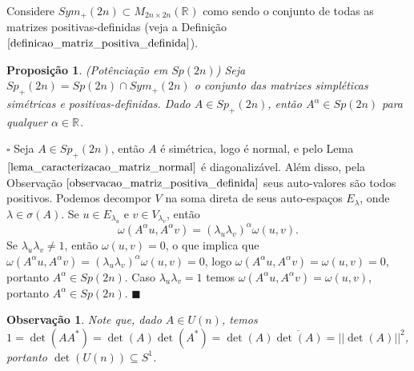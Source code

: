 \documentclass[12pt]{book}
\newtheorem{observacao}[teorema]{Observação}
\newtheorem{proposicao}[teorema]{Proposição}
\newenvironment{prova}[1]{$\square$ #1}{\hfill$\blacksquare$}
\newcommand{\espectrooperador}[1]{\sigma(#1)}
\newcommand{\gruposimpletico}[1]{Sp(#1)}
\newcommand{\gruposimpleticopositivo}[1]{Sp_{+}(#1)}
\newcommand{\matrizquadreal}[1]{M_{#1 \times #1}(\real{})}
\newcommand{\matrizsimetricapositiva}[1]{Sym_{+}(#1)}
\newcommand{\matrizunitaria}[1]{U(#1)}
\newcommand{\real}[1]{\mathbb{R}^{#1}}
\begin{document}
	Considere $\matrizsimetricapositiva{2n} \subset \matrizquadreal{2n}$ como sendo o conjunto de todas as matrizes positivas-definidas (veja a Definição $\ref{definicao_matriz_positiva_definida}$).
	
	\begin{proposicao}\label{proposicao_potenciacao_grupo_simpletico}
		(Potênciação em $\gruposimpletico{2n}$) Seja $\gruposimpleticopositivo{2n} = \gruposimpletico{2n} \cap \matrizsimetricapositiva{2n}$ o conjunto das matrizes simpléticas simétricas e positivas-definidas. Dado $A \in \gruposimpleticopositivo{2n}$, então $A^{\alpha} \in \gruposimpletico{2n}$ para qualquer $\alpha \in \real{}$.
	\end{proposicao}
	\begin{prova}
		Seja $A \in \gruposimpleticopositivo{2n}$, então $A$ é simétrica, logo é normal, e pelo Lema $\ref{lema_caracterizacao_matriz_normal}$ é diagonalizável. Além disso, pela Observação $\ref{observacao_matriz_positiva_definida}$ seus auto-valores são todos positivos. Podemos decompor $V$ na soma direta de seus auto-espaços $E_{\lambda}$, onde $\lambda \in \espectrooperador{A}$. Se $u \in E_{\lambda_{u}}$ e $v \in V_{\lambda_{v}}$, então
		$$
		\omega(A^{\alpha}u,A^{\alpha}v) = 		(\lambda_{u}\lambda_{v})^{\alpha}\omega(u,v).
		$$
		Se $\lambda_{u}\lambda_{v}\neq 1$, então $\omega(u,v)=0$, o que implica que $\omega(A^{\alpha}u,A^{\alpha}v)=(\lambda_{u}\lambda_{v})^{\alpha}\omega(u,v)=0$, logo $\omega(A^{\alpha}u,A^{\alpha}v) = \omega(u,v)=0$, portanto $A^{\alpha} \in \gruposimpletico{2n}$. Caso $\lambda_{u}\lambda_{v}=1$ temos $\omega(A^{\alpha}u,A^{\alpha}v) = \omega(u,v)$, portanto $A^{\alpha} \in \gruposimpletico{2n}$.
	\end{prova}
	
	\begin{observacao}\label{observacao_determinante_matriz_unitaria}
		Note que, dado $A \in \matrizunitaria{n}$, temos $1= \det(AA^{*}) = \det(A)\det(A^{*}) = \det(A)\overline{\det(A)} = ||\det(A)||^{2}$, portanto $\det(\matrizunitaria{n}) \subseteq S^{1}$.
	\end{observacao}
	
\end{document}
